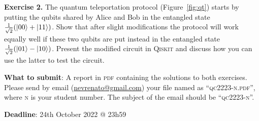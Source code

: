 \documentclass[a4paper, 11pt]{article}
\theoremstyle{definition}
\begin{document}
\noindent
\textbf{Exercise 2.} The quantum teleportation protocol
(Figure~\ref{fig:qt}) starts by putting the qubits shared by Alice and
Bob in the entangled state $\frac{1}{\sqrt{2}}(\ket{00} + \ket{11})$.
Show that after slight modifications the protocol will work equally
well if these two qubits are put instead in the entangled state
$\frac{1}{\sqrt{2}}(\ket{01} - \ket{10})$. Present the modified
circuit in \textsc{Qiskit} and discuss how you can use the latter to test the
circuit.

\bigskip
\begin{mdframed}
\noindent
\textbf{What to submit}: A report in \textsc{pdf} containing the solutions to
both exercises. Please send by email (\underline{nevrenato@gmail.com}) your
file named as ``\textsc{qc2223-n.pdf}'', where \textsc{n} is your student
number. The subject of the email should be ``\textsc{qc2223-n}''.

\noindent
\textbf{Deadline}: 24th October 2022 @ 23h59
\end{mdframed}


\end{document}
